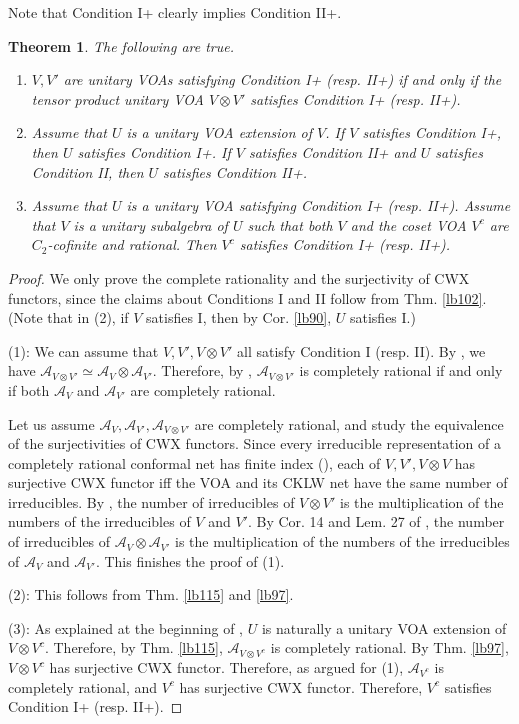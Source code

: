 \documentclass[11pt,b5paper,notitlepage]{article}
\theoremstyle{definition}
\theoremstyle{plain}
\newtheorem{thm}[df]{Theorem}
\newcommand{\mc}{\mathcal}
\numberwithin{equation}{section}
\begin{document}
Note that Condition I+ clearly implies Condition II+.

\begin{thm}\label{lb116}
The following are true.
\begin{enumerate}[label=(\arabic*)]
\item $V,V'$ are unitary VOAs satisfying Condition I+ (resp. II+) if and only if the tensor product unitary VOA $V\otimes V'$ satisfies Condition I+ (resp. II+).
\item Assume that $U$ is a unitary VOA extension of $V$. If $V$ satisfies Condition I+, then $U$ satisfies Condition I+. If $V$ satisfies Condition II+ and $U$ satisfies Condition II, then $U$ satisfies Condition II+.
\item Assume that $U$ is a unitary VOA satisfying Condition I+ (resp. II+). Assume that $V$ is a unitary subalgebra of $U$ such that both $V$ and the coset VOA $V^c$ are $C_2$-cofinite and rational. Then $V^c$ satisfies Condition I+ (resp. II+).
\end{enumerate}
\end{thm}


\begin{proof}
We only prove the complete rationality and the surjectivity of CWX functors, since the claims about Conditions I and II follow from Thm. \ref{lb102}. (Note that in (2), if $V$ satisfies I, then by Cor. \ref{lb90}, $U$ satisfies I.)

(1): We can assume that $V,V',V\otimes V'$ all satisfy Condition I (resp. II). By \cite[Cor. 8.2]{CKLW18}, we have $\mc A_{V\otimes V'}\simeq\mc A_V\otimes\mc A_{V'}$. Therefore, by \cite[Lem. 25]{Lon03}, $\mc A_{V\otimes V'}$ is completely rational if and only if both $\mc A_V$ and $\mc A_{V'}$ are completely rational.

Let us assume $\mc A_V,\mc A_{V'},\mc A_{V\otimes V'}$ are completely rational, and study the equivalence of the surjectivities of CWX functors. Since every irreducible representation of a completely rational conformal net has finite index (\cite{LX04}), each of $V,V',V\otimes V$ has surjective CWX functor iff the VOA and its CKLW net have the same number of irreducibles. By \cite[Thm. 4.7.4]{FHL93}, the number of irreducibles of $V\otimes V'$ is the multiplication of the numbers of the irreducibles of $V$ and $V'$. By Cor. 14 and Lem. 27 of \cite{KLM01}, the number of irreducibles of $\mc A_V\otimes\mc A_{V'}$ is the multiplication of the numbers of the irreducibles of $\mc A_V$ and $\mc A_{V'}$. This finishes the proof of (1).



(2): This follows from Thm. \ref{lb115} and \ref{lb97}.


(3): As explained at the beginning of \cite[Sec. 2.6]{Gui20}, $U$ is naturally a unitary VOA extension of $V\otimes V^c$. Therefore, by Thm. \ref{lb115}, $\mc A_{V\otimes V^c}$ is completely rational. By Thm. \ref{lb97}, $V\otimes V^c$ has surjective CWX functor. Therefore, as argued for (1), $\mc A_{V^c}$ is completely rational, and $V^c$ has surjective CWX functor. Therefore, $V^c$ satisfies Condition I+ (resp. II+). 
\end{proof}
\end{document}
